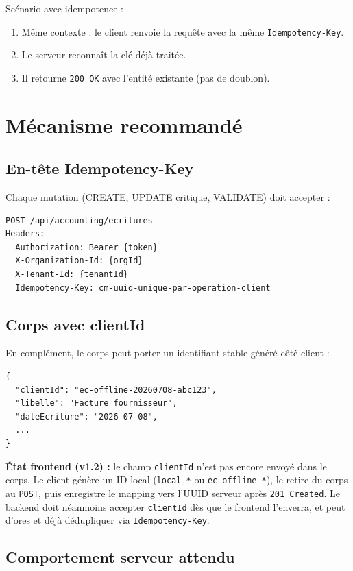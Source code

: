 \documentclass[12pt,a4paper]{report}
\begin{document}
Scénario avec idempotence :
\begin{enumerate}
  \item Même contexte : le client renvoie la requête avec la même \texttt{Idempotency-Key}.
  \item Le serveur reconnaît la clé déjà traitée.
  \item Il retourne \texttt{200 OK} avec l'entité existante (pas de doublon).
\end{enumerate}

\section{Mécanisme recommandé}

\subsection{En-tête Idempotency-Key}

Chaque mutation (CREATE, UPDATE critique, VALIDATE) doit accepter :

\begin{verbatim}
POST /api/accounting/ecritures
Headers:
  Authorization: Bearer {token}
  X-Organization-Id: {orgId}
  X-Tenant-Id: {tenantId}
  Idempotency-Key: cm-uuid-unique-par-operation-client
\end{verbatim}

\subsection{Corps avec clientId}

En complément, le corps peut porter un identifiant stable généré côté client :

\begin{verbatim}
{
  "clientId": "ec-offline-20260708-abc123",
  "libelle": "Facture fournisseur",
  "dateEcriture": "2026-07-08",
  ...
}
\end{verbatim}

\textbf{État frontend (v1.2) :} le champ \texttt{clientId} n'est pas encore envoyé dans le corps. Le client génère un ID local (\texttt{local-*} ou \texttt{ec-offline-*}), le retire du corps au \texttt{POST}, puis enregistre le mapping vers l'UUID serveur après \texttt{201 Created}. Le backend doit néanmoins accepter \texttt{clientId} dès que le frontend l'enverra, et peut d'ores et déjà dédupliquer via \texttt{Idempotency-Key}.

\subsection{Comportement serveur attendu}
\end{document}
